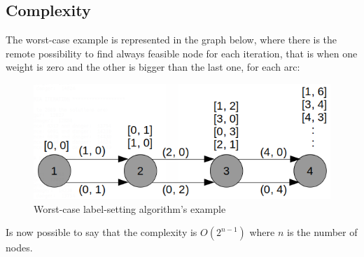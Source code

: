 \documentclass[a4paper,11pt]{report}
\begin{document}
\subsection{Complexity}
The worst-case example is represented in the graph below, where there is the remote possibility to find always feasible node for each iteration, that is when one weight is zero and the other is bigger than the last one, for each arc:

\begin{figure}[H]
	\centering
	\includegraphics[width=\linewidth]{img/labelSettingComplexity.png}
	\caption{Worst-case label-setting algorithm's example}
	\label{fig:worstCaseLabelSettin}
\end{figure}
Is now possible to say that the complexity is $O(2^{n-1})$ where $n$ is the number of nodes. 
\end{document}
